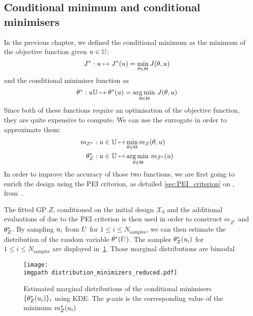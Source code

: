 \documentclass[../../Main_ManuscritThese.tex]{subfiles}
\newcommand\imgpath{/home/victor/acadwriting/Manuscrit/Text/Chapter5/img/}
\begin{document}
\subsection{Conditional minimum and conditional minimisers}
\label{ssec:croco_cond_minimum_minimisers}
In the previous chapter, we defined the conditional minimum as the
minimum of the objective function given $u\in \mathbb{U}$:
\begin{equation}
  J^* : u \mapsto J^*(u) = \min_{\theta\in\Theta} J(\theta, u)
\end{equation}
and the conditional minimiser function as
\begin{equation}
  \theta^*:u \mathbb{U} \mapsto \theta^*(u) = \operatorname*{arg\,min \,}_{\theta \in \Theta} J(\theta, u)
\end{equation}
Since both of these functions require an optimisation of the objective
function, they are quite expensive to compute. We can use the
surrogate in order to approximate them:
\begin{align}
  m_{Z^*}: u\in\mathbb{U} \mapsto &\min_{\theta \in \Theta} m_Z(\theta, u) \\
  \theta^*_{Z}: u \in \mathbb{U} \mapsto &\operatorname*{arg\,min \,}_{\theta \in \Theta} m_{Z^*}(u)
\end{align}
In order to improve the accuracy of those two functions, we are first
going to enrich the design using the PEI criterion, as detailed
\cref{sec:PEI_criterion} on ,
from~\cite{ginsbourger_bayesian_2014}.

The fitted GP $Z$, conditioned on the initial design $\mathcal{X}_0$
and the additional evaluations of due to the PEI criterion is then
used in order to construct $m_{Z^*}$ and $\theta^*_Z$.  By sampling
$u_i$ from $U$ for $1\leq i \leq N_{\mathrm{samples}}$, we can then estimate the distribution of the random variable $\theta^*(U)$. The samples $\theta^*_Z(u_i)$ for $1\leq i \leq N_{\mathrm{samples}}$ are displayed in~\cref{fig:distrib_minimizers_reduced}. Those marginal distributions are bimodal
\begin{figure}[ht]
  \centering
  \texttt{[image: \\imgpath distribution\_minimizers\_reduced.pdf]}
  \caption{\label{fig:distrib_minimizers_reduced}  Estimated marginal distributions of the conditional minimisers $\{\theta^*_Z(u_i)\}_i$ using KDE. The $y$-axis is the corresponding value of the minimum $m_Z^*(u_i)$}
\end{figure}
\end{document}
